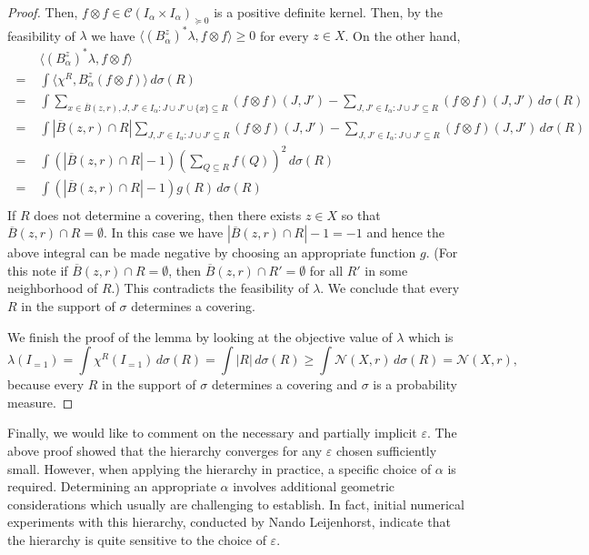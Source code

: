 \documentclass{amsart}
\begin{document}
\begin{proof}
 Then, $f \otimes f \in
\mathcal{C}(I_\alpha \times I_\alpha)_{\succeq 0}$ 
is a positive definite kernel.  Then, by the feasibility of $\lambda$ we have $\langle (B^z_{\alpha})^* \lambda, f \otimes f \rangle \geq 0$ for every $z \in X$. On the other hand,
\[
  \begin{split}
& \langle (B^z_{\alpha})^* \lambda, f \otimes f\rangle \\
    \; = \; &   \int \langle \chi^R, B^z_{\alpha}(f \otimes f)\rangle \, d\sigma(R)\\
 \; = \;  &  \int  \sum_{x \in \overline{B}(z,r), J, J'\in I_\alpha : J \cup J' \cup
    \{x\} \subseteq R} (f \otimes f)(J,J')   - \sum_{J,J' \in I_\alpha : J
    \cup J' \subseteq R} (f \otimes f) (J,J')\, d\sigma(R)\\
  \; = \; & \int |\overline{B}(z,r) \cap R|  \sum_{ J, J'\in I_\alpha : J \cup J' 
    \subseteq R} (f \otimes f)(J,J')   - \sum_{J,J' \in I_\alpha : J
    \cup J' \subseteq R} (f \otimes f)(J,J') \, d\sigma(R)\\
  \; = \; & \int (|\overline{B}(z,r) \cap R| - 1) \left(\sum_{Q \subseteq R} f(Q) \right)^2 \, d\sigma(R)\\
  \; = \; & \int (|\overline{B}(z,r) \cap R| - 1) g(R) \, d\sigma(R)\\
  \end{split}
\]
If $R$ does not determine a covering, then there exists $z \in X$ so that
  $\overline{B}(z,r) \cap R = \emptyset$. In this case we have
  $|\overline{B}(z,r) \cap R| - 1 = -1$ and hence the above integral can be made negative by choosing an appropriate function $g$. 
  (For this note if $\overline{B}(z, r) \cap R = \emptyset$,
  then $\overline{B}(z, r) \cap R' = \emptyset$ for all $R'$ in some neighborhood of $R$.)
  This contradicts the feasibility of $\lambda$. We conclude that every $R$ in the support of $\sigma$ determines a
  covering.

We finish the proof of the lemma by looking at the objective value of
$\lambda$ which is
\[
  \lambda(I_{=1}) =\int \chi^{R}(I_{=1}) \, d\sigma(R) = \int |R| \, d\sigma(R) \geq \int \mathcal{N}(X,r)
  \, d\sigma(R) =\mathcal{N}(X,r),
\]
because every $R$ in the support of $\sigma$ determines a covering and
$\sigma$ is a probability measure.
\end{proof}

Finally, we would like to comment on the
necessary and partially implicit $\varepsilon$. The above proof showed that the hierarchy converges for any $\varepsilon$ chosen sufficiently small. However, when applying the hierarchy in practice, a specific choice of $\alpha$ is required. Determining an appropriate $\alpha$ involves  additional geometric considerations which usually are  challenging  to establish. In fact, initial numerical experiments with this hierarchy, conducted by Nando Leijenhorst, indicate that the hierarchy is quite sensitive to the choice of $\varepsilon$.
\end{document}
